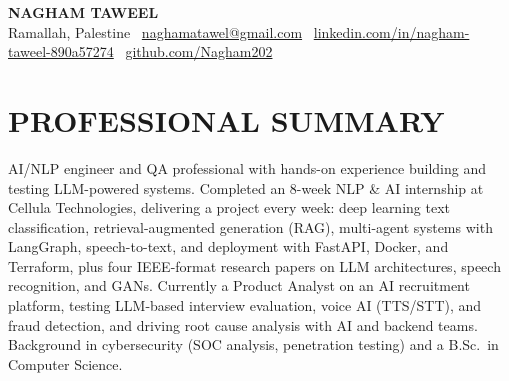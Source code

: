 \documentclass[10pt]{article}
\begin{document}
\raggedright

\begin{center}
{\color{heading}\Huge\bfseries NAGHAM TAWEEL}\\[4pt]
{\small Ramallah, Palestine \textbar\ \href{mailto:naghamatawel@gmail.com}{naghamatawel@gmail.com} \textbar\ \href{https://www.linkedin.com/in/nagham-taweel-890a57274/}{linkedin.com/in/nagham-taweel-890a57274} \textbar\ \href{https://github.com/Nagham202}{github.com/Nagham202}}
\end{center}

\section{PROFESSIONAL SUMMARY}
AI/NLP engineer and QA professional with hands-on experience building and testing LLM-powered systems. Completed an 8-week NLP \& AI internship at Cellula Technologies, delivering a project every week: deep learning text classification, retrieval-augmented generation (RAG), multi-agent systems with LangGraph, speech-to-text, and deployment with FastAPI, Docker, and Terraform, plus four IEEE-format research papers on LLM architectures, speech recognition, and GANs. Currently a Product Analyst on an AI recruitment platform, testing LLM-based interview evaluation, voice AI (TTS/STT), and fraud detection, and driving root cause analysis with AI and backend teams. Background in cybersecurity (SOC analysis, penetration testing) and a B.Sc.\ in Computer Science.
\end{document}
